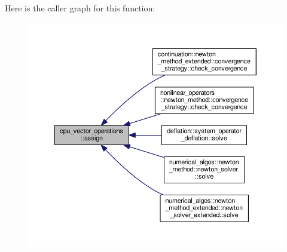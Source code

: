 Here is the caller graph for this function\-:
\nopagebreak
\begin{figure}[H]
\begin{center}
\leavevmode
\includegraphics[width=350pt]{structcpu__vector__operations_aee016bc7ac6cc3a7149d3444e5b0ac57_icgraph}
\end{center}
\end{figure}


